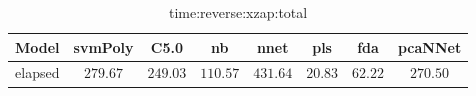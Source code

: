 \begin{table}[!ht]
	\centering
	\begin{tabular}{|c|c|c|c|c|c|c|c|}
		\hline
		Model & svmPoly & C5.0 & nb & nnet & pls & fda & pcaNNet \\ \hline
		elapsed & $279.67$ & $249.03$ & $110.57$ & $431.64$ & $20.83$ & $62.22$ & $270.50$ \\ \hline
	\end{tabular}
	\caption{time:reverse:xzap:total}
	\label{tab:time:reverse:xzap:total}
\end{table}
